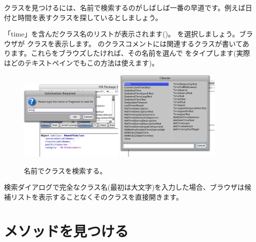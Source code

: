 \documentclass[a4paper,10pt,twoside]{book}
\begin{document}
クラスを見つけるには、名前で検索するのがしばしば一番の早道です。例えば日付と時間を表すクラスを探しているとしましょう。

\noindent
「time」を含んだクラス名のリストが表示されます()。 を選択しましょう。ブラウザが  クラスを表示します。 のクラスコメントには関連するクラスが書いてあります。これらをブラウズしたければ、その名前を選んで  をタイプします(実際はどのテキストペインでもこの方法は使えます)。

\begin{figure}[hbt]
\centerline{
	\includegraphics[width=0.45\textwidth]{FindIt}
	\hspace{1cm}
	\includegraphics[width=0.45\textwidth]{TimeClasses}
}
\caption{名前でクラスを検索する。
}
\end{figure}

検索ダイアログで完全なクラス名(最初は大文字)を入力した場合、ブラウザは候補リストを表示することなくそのクラスを直接開きます。

\section{メソッドを見つける}
\end{document}
